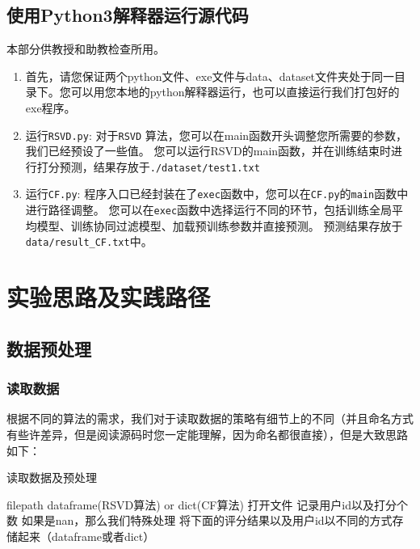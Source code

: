 \subsection{使用Python3解释器运行源代码}
本部分供教授和助教检查所用。
\begin{enumerate}
	\item 首先，请您保证两个python文件、exe文件与data、dataset文件夹处于同一目录下。您可以用您本地的python解释器运行，也可以直接运行我们打包好的exe程序。
	\item 运行\verb|RSVD.py|:
		\iitem 对于\texttt{RSVD} 算法，您可以在main函数开头调整您所需要的参数，我们已经预设了一些值。
		\iitem 您可以运行RSVD的main函数，并在训练结束时进行打分预测，结果存放于\texttt{./dataset/test1.txt}
	\item 运行\verb|CF.py|:
		\iitem 程序入口已经封装在了\texttt{exec}函数中，您可以在\texttt{CF.py}的\texttt{main}函数中进行路径调整。
		\iitem 您可以在\texttt{exec}函数中选择运行不同的环节，包括训练全局平均模型、训练协同过滤模型、加载预训练参数并直接预测。
		\iitem 预测结果存放于\texttt{data/result\_CF.txt}中。
\end{enumerate}

\section{实验思路及实践路径}

\subsection{数据预处理}

\subsubsection{读取数据}
根据不同的算法的需求，我们对于读取数据的策略有细节上的不同（并且命名方式有些许差异，但是阅读源码时您一定能理解，因为命名都很直接），但是大致思路如下：
\begin{breakablealgorithm} 
	\caption{读取数据及预处理} 
	\begin{algorithmic}[1] %
		\Require filepath
		\Ensure dataframe(RSVD算法) or dict(CF算法)
			\State 打开文件
					\State 记录用户id以及打分个数
				\Else 
					\State 如果是nan，那么我们特殊处理
					\State 将下面的评分结果以及用户id以不同的方式存储起来（dataframe或者dict）
				\EndIf
			\EndWhile
		\EndFunction
	\end{algorithmic}  
\end{breakablealgorithm}

